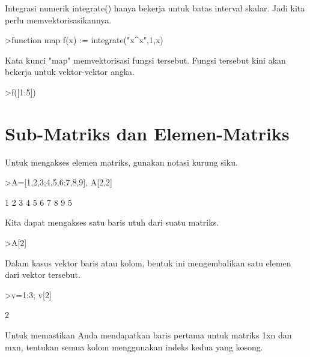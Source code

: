 \documentclass{article}
\newenvironment{eulernotebook}{\par}{\par}
\newcommand{\eulerheading}[1]{\section{#1}}
\newenvironment{eulercomment}{\par\medskip}{\par\medskip}
\begin{document}
\begin{eulernotebook}
\begin{eulercomment}
\begin{eulercomment}
\begin{eulercomment}
\begin{eulercomment}
\begin{eulercomment}
\begin{eulercomment}
\begin{eulercomment}
Integrasi numerik integrate() hanya bekerja untuk batas interval
skalar. Jadi kita perlu memvektorisasikannya.
\end{eulercomment}
\begin{eulerprompt}
>function map f(x) := integrate("x^x",1,x)
\end{eulerprompt}
\begin{eulercomment}
Kata kunci "map" memvektorisasi fungsi tersebut. Fungsi tersebut kini
akan bekerja untuk vektor-vektor angka.
\end{eulercomment}
\begin{eulerprompt}
>f([1:5])
\end{eulerprompt}
\begin{euleroutput}
  [0,  2.05045,  13.7251,  113.336,  1241.03]
\end{euleroutput}
\eulerheading{Sub-Matriks dan Elemen-Matriks}
\begin{eulercomment}
Untuk mengakses elemen matriks, gunakan notasi kurung siku.
\end{eulercomment}
\begin{eulerprompt}
>A=[1,2,3;4,5,6;7,8,9], A[2,2]
\end{eulerprompt}
\begin{euleroutput}
              1             2             3 
              4             5             6 
              7             8             9 
  5
\end{euleroutput}
\begin{eulercomment}
Kita dapat mengakses satu baris utuh dari suatu matriks.
\end{eulercomment}
\begin{eulerprompt}
>A[2]
\end{eulerprompt}
\begin{euleroutput}
  [4,  5,  6]
\end{euleroutput}
\begin{eulercomment}
Dalam kasus vektor baris atau kolom, bentuk ini mengembalikan satu
elemen dari vektor tersebut.
\end{eulercomment}
\begin{eulerprompt}
>v=1:3; v[2]
\end{eulerprompt}
\begin{euleroutput}
  2
\end{euleroutput}
\begin{eulercomment}
Untuk memastikan Anda mendapatkan baris pertama untuk matriks 1xn dan
mxn, tentukan semua kolom menggunakan indeks kedua yang kosong.
\end{eulercomment}

\end{eulercomment}
\end{eulercomment}
\end{eulercomment}
\end{eulercomment}
\end{eulercomment}
\end{eulercomment}
\end{eulernotebook}
\end{document}
